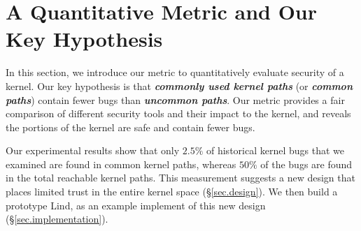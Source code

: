 \section{A Quantitative Metric and Our Key Hypothesis}
\label{sec.metric}
In this section, we introduce our metric to quantitatively evaluate security of a kernel. 
Our key hypothesis is that \textbf{\textit{commonly used kernel paths}} (or 
\textbf{\textit{common paths}}) contain fewer bugs than \textbf{\textit{uncommon paths}}. 
Our metric provides a fair comparison of different security tools and their impact to the kernel, 
and reveals the portions of the kernel are safe and contain fewer bugs. 

Our experimental results show that only $2.5\%$ of historical kernel bugs that we examined are 
found in common kernel paths, whereas $50\%$ of the bugs are found in the total 
reachable kernel paths. This measurement suggests a new design that 
places limited trust in the entire kernel space (\S{\ref{sec.design}}). 
We then build a prototype Lind, as an example implement of this new design 
(\S{\ref{sec.implementation}}). 


